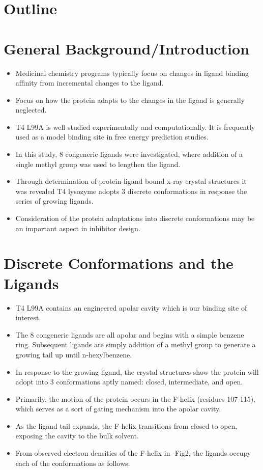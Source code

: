 \documentclass{article}
\begin{document}
\pagebreak
\section*{Outline}
\section{General Background/Introduction}
   \begin{itemize}
   \item Medicinal chemistry programs typically focus on changes in ligand binding affinity from incremental changes to the ligand.
   \item Focus on how the protein adapts to the changes in the ligand is generally neglected.
   \item T4 L99A is well studied experimentally and computationally. 
      It is frequently used as a model binding site in free energy prediction studies.
   \item In this study, 8 congeneric ligands were investigated, where addition of a single methyl group was used to lengthen the ligand.
   \item Through determination of protein-ligand bound x-ray crystal structures it was revealed T4 lysozyme adopts 3 discrete conformations in response the series of growing ligands.
   \item Consideration of the protein adaptations into discrete conformations may be an important aspect in inhibitor design.
   \end{itemize}

\section{Discrete Conformations and the Ligands}
   \begin{itemize}
   \item T4 L99A contains an engineered apolar cavity which is our binding site of interest.
   \item The 8 congeneric ligands are all apolar and begins with a simple benzene ring. 
      Subsequent ligands are simply addition of a methyl group to generate a growing tail up until n-hexylbenzene.
   \item In response to the growing ligand, the crystal structures show the protein will adopt into 3 conformations aptly named: closed, intermediate, and open.
   \item Primarily, the motion of the protein occurs in the F-helix (residues 107-115), which serves as a sort of gating mechanism into the apolar cavity.
   \item As the ligand tail expands, the F-helix transitions from closed to open, exposing the cavity to the bulk solvent.
   \item From observed electron densities of the F-helix in \cite{Merski2015}-Fig2, the ligands occupy each of the conformations as follows:
   \end{itemize}
   
\end{document}
